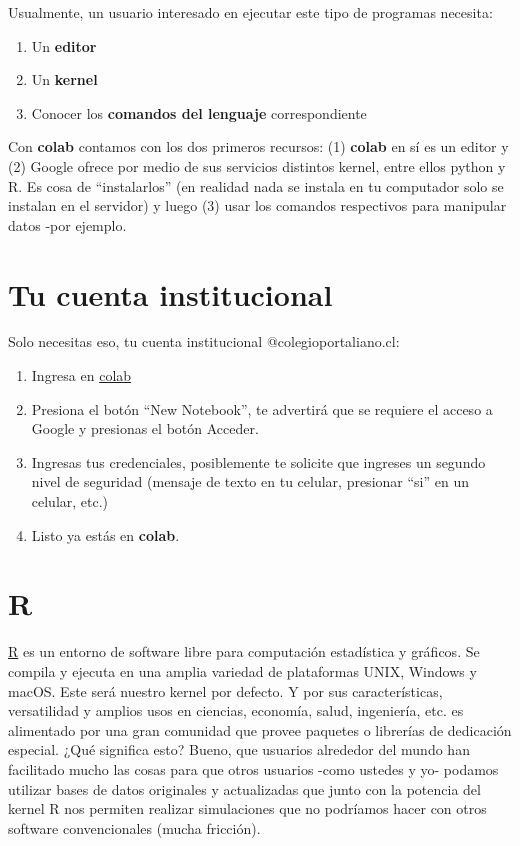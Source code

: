 \documentclass[
  spanish,
  letterpaper,
  DIV=11,
  numbers=noendperiod]{scrartcl}
\providecommand{\tightlist}{%
  \setlength{\itemsep}{0pt}\setlength{\parskip}{0pt}}
\begin{document}
Usualmente, un usuario interesado en ejecutar este tipo de programas
necesita:

\begin{enumerate}
\def\labelenumi{\arabic{enumi}.}
\tightlist
\item
  Un \textbf{editor}
\item
  Un \textbf{kernel}
\item
  Conocer los \textbf{comandos del lenguaje} correspondiente
\end{enumerate}

Con \textbf{colab} contamos con los dos primeros recursos: (1)
\textbf{colab} en sí es un editor y (2) Google ofrece por medio de sus
servicios distintos kernel, entre ellos python y R. Es cosa de
``instalarlos'' (en realidad nada se instala en tu computador solo se
instalan en el servidor) y luego (3) usar los comandos respectivos para
manipular datos -por ejemplo.

\section{Tu cuenta institucional}\label{tu-cuenta-institucional}

Solo necesitas eso, tu cuenta institucional @colegioportaliano.cl:

\begin{enumerate}
\def\labelenumi{\arabic{enumi}.}
\tightlist
\item
  Ingresa en \href{https://colab.google/}{colab}
\item
  Presiona el botón ``New Notebook'', te advertirá que se requiere el
  acceso a Google y presionas el botón Acceder.
\item
  Ingresas tus credenciales, posiblemente te solicite que ingreses un
  segundo nivel de seguridad (mensaje de texto en tu celular, presionar
  ``si'' en un celular, etc.)
\item
  Listo ya estás en \textbf{colab}.
\end{enumerate}

\section{R}\label{r}

\href{https://www.r-project.org}{R} es un entorno de software libre para
computación estadística y gráficos. Se compila y ejecuta en una amplia
variedad de plataformas UNIX, Windows y macOS. Este será nuestro kernel
por defecto. Y por sus características, versatilidad y amplios usos en
ciencias, economía, salud, ingeniería, etc. es alimentado por una gran
comunidad que provee paquetes o librerías de dedicación especial. ¿Qué
significa esto? Bueno, que usuarios alrededor del mundo han facilitado
mucho las cosas para que otros usuarios -como ustedes y yo- podamos
utilizar bases de datos originales y actualizadas que junto con la
potencia del kernel R nos permiten realizar simulaciones que no
podríamos hacer con otros software convencionales (mucha fricción).
\end{document}
